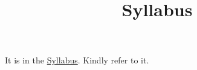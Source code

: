 \documentclass{article}
\title{Syllabus}
\begin{document}
It is in the \href{https://www.youtube.com/watch?v=M9DLZO1J8aQ}{Syllabus}. Kindly refer to it.
\end{document}
